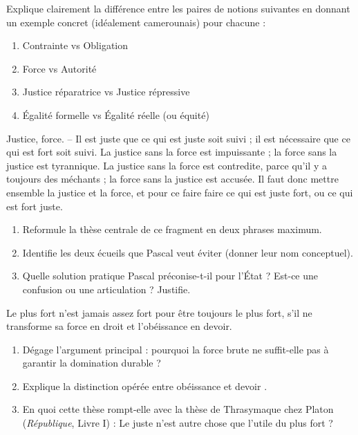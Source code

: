 \documentclass[11pt]{article}
\newcommand{\cle}[1]{{\popxbold\color{popdark}#1}}
\newcounter{popsec}
\newcounter{popsub}
\newcommand{\courssub}[1]{%
  \stepcounter{popsub}%
  \par\vspace{9pt}\noindent{\popxbold\fontsize{11.5}{13}\selectfont\color{popink}{\color{poporange}\thepopsec.\thepopsub}\hspace{6pt}#1}\par\nopagebreak\vspace{4pt}
}
\begin{document}
\begin{exercice}
Explique clairement la différence entre les paires de notions suivantes en donnant un exemple concret (idéalement camerounais) pour chacune :
\begin{enumerate}
    \item \cle{Contrainte} vs \cle{Obligation}
    \item \cle{Force} vs \cle{Autorité}
    \item \cle{Justice réparatrice} vs \cle{Justice répressive}
    \item \cle{Égalité formelle} vs \cle{Égalité réelle} (ou équité)
\end{enumerate}
\end{exercice}

\courssub{Je m'entraîne}

\begin{exercice}
\guillemotleft Justice, force. -- Il est juste que ce qui est juste soit suivi ; il est nécessaire que ce qui est fort soit suivi. La justice sans la force est impuissante ; la force sans la justice est tyrannique. La justice sans la force est contredite, parce qu'il y a toujours des méchants ; la force sans la justice est accusée. Il faut donc mettre ensemble la justice et la force, et pour ce faire faire ce qui est juste fort, ou ce qui est fort juste. \guillemotright
\begin{enumerate}
    \item Reformule la thèse centrale de ce fragment en deux phrases maximum.
    \item Identifie les deux écueils que Pascal veut éviter (donner leur nom conceptuel).
    \item Quelle solution pratique Pascal préconise-t-il pour l'État ? Est-ce une confusion ou une articulation ? Justifie.
\end{enumerate}
\end{exercice}

\begin{exercice}
\guillemotleft Le plus fort n'est jamais assez fort pour être toujours le plus fort, s'il ne transforme sa force en droit et l'obéissance en devoir. \guillemotright
\begin{enumerate}
    \item Dégage l'argument principal : pourquoi la force brute ne suffit-elle pas à garantir la domination durable ?
    \item Explique la distinction opérée entre \guillemotleft obéissance \guillemotright et \guillemotleft devoir \guillemotright.
    \item En quoi cette thèse rompt-elle avec la thèse de \cle{Thrasymaque} chez Platon (\emph{République}, Livre I) : \guillemotleft Le juste n'est autre chose que l'utile du plus fort \guillemotright ?
\end{enumerate}
\end{exercice}
\end{document}
